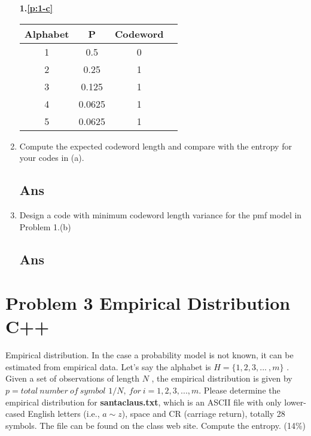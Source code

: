 \documentclass[a4paper, 11pt]{article}
\begin{document}
\begin{enumerate}[label=(\alph*)]
\begin{multicols}{2}
        \null \vfill
  \end{multicols}

  \textbf{1.\ref{p:1-c}}
  \begin{multicols}{2}
      \columnbreak

      \null \vfill
      \begin{tabular}{ |c|c|c|c| } 
        \hline
        Alphabet & P  & Codeword \\
        \hline
        1 & 0.5     & 0 \\ 
        2 & 0.25    & 1 \\  
        3 & 0.125   & 1 \\  
        4 & 0.0625  & 1 \\  
        5 & 0.0625  & 1 \\  
        \hline
        \end{tabular}

        \null \vfill
  \end{multicols}
  \item Compute the expected codeword length and compare with the entropy for your codes in (a).
  \subsection*{Ans}
  
  \item Design a code with minimum codeword length variance for the pmf model in Problem 1.(b)
  \subsection*{Ans}
\end{enumerate}
\section*{Problem 3 Empirical Distribution C++}
Empirical distribution. In the case a probability model is not known, it can be 
estimated from empirical data. Let’s say the alphabet is $H=\{1, 2, 3,...~,m\}$ . 
Given a set of 
observations of length $N$ , the empirical distribution is given by $p=total~number 
~of~symbol$ $1/N,~for~i=1, 2, 3,..., m$. Please determine the empirical distribution 
for \textbf{santaclaus.txt}, which is an ASCII file with only lower-cased English 
letters (i.e., $a\sim z$), space and CR (carriage return), totally 28 symbols. The 
file can be found on the class web site. Compute the entropy. (14\%)
\end{document}

